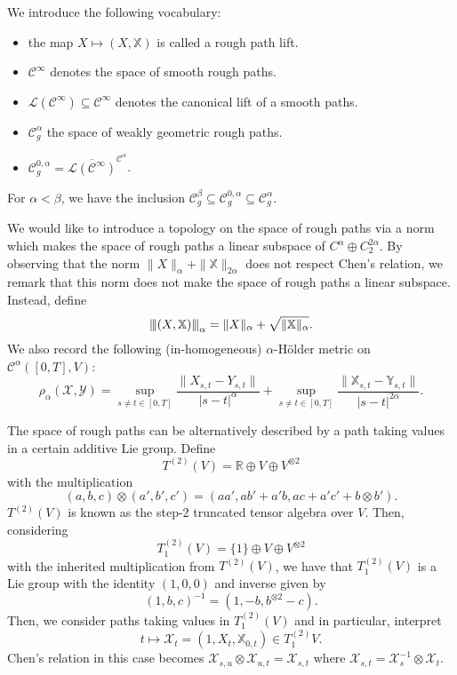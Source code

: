 \documentclass[]{article}
\theoremstyle{definition}
\theoremstyle{definition}
\newcommand{\vertiii}[1]{{\left\vert\kern-0.25ex\left\vert\kern-0.25ex\left\vert #1 
    \right\vert\kern-0.25ex\right\vert\kern-0.25ex\right\vert}}
\begin{document}
We introduce the following vocabulary:
\begin{itemize}
  \item the map \(X \mapsto (X, \mathbb{X})\) is called a rough path lift.
  \item \(\mathcal{C}^\infty\) denotes the space of smooth rough paths.
  \item \(\mathcal{L}(\mathcal{C}^\infty) \subseteq \mathcal{C}^\infty\) denotes the canonical lift of a smooth paths.
  \item \(\mathcal{C}^\alpha_g\) the space of weakly geometric rough paths.
  \item \(\mathcal{C}^{0, \alpha}_g = \overline{\mathcal{L}(\mathcal{C}^\infty)}^{\mathcal{C}^\alpha}\).
\end{itemize}

For \(\alpha < \beta\), we have the inclusion \(\mathcal{C}^\beta_g \subseteq \mathcal{C}^{0, \alpha}_g \subseteq \mathcal{C}^\alpha_g\).

We would like to introduce a topology on the space of rough paths via a norm which makes the space of rough paths 
a linear subspace of \(C^\alpha \oplus C_2^{2\alpha}\). By observing that the norm \(\|X\|_{\alpha} + \|\mathbb{X}\|_{2\alpha}\)
does not respect Chen's relation, we remark that this norm does not make the space of rough paths a linear subspace. 
Instead, define 
\[\vertiii{(X, \mathbb{X})}_\alpha = \|X\|_\alpha + \sqrt{\|\mathbb{X}\|_{\alpha}}.\]
We also record the following (in-homogeneous) \(\alpha\)-H\"older metric on \(\mathcal{C}^\alpha([0, T], V)\):
\[\rho_\alpha(\mathcal{X}, \mathcal{Y}) = \sup_{s \neq t \in [0, T]}\frac{\|X_{s, t} - Y_{s, t}\|}{|s - t|^\alpha} + 
  \sup_{s \neq t \in [0, T]}\frac{\|\mathbb{X}_{s, t} - \mathbb{Y}_{s, t}\|}{|s - t|^{2\alpha}}.\]


The space of rough paths can be alternatively described by a path taking values in a certain additive Lie group. 
Define 
\[T^{(2)}(V) = \mathbb{R} \oplus V \oplus V^{\otimes 2}\]
with the multiplication 
\[(a, b, c) \otimes (a', b', c') = (aa', ab' + a'b, ac + a'c' + b \otimes b').\]
\(T^{(2)}(V)\) is known as the step-2 truncated tensor algebra over \(V\). Then, considering 
\[T^{(2)}_1(V) = \{1\} \oplus V \oplus V^{\otimes 2}\]
with the inherited multiplication from \(T^{(2)}(V)\), we have that \(T^{(2)}_1(V)\) is a Lie group 
with the identity \((1, 0, 0)\) and inverse given by 
\[(1, b, c)^{-1} = (1, -b, b^{\otimes 2} - c).\]
Then, we consider paths taking values in \(T^{(2)}_1(V)\) and in particular, interpret 
\[t \mapsto \mathcal{X}_t = (1, X_t, \mathbb{X}_{0, t}) \in T^{(2)}_1{V}.\]
Chen's relation in this case becomes \(\mathcal{X}_{s, u} \otimes \mathcal{X}_{u, t} = \mathcal{X}_{s, t}\) 
where \(\mathcal{X}_{s, t} = \mathcal{X}_{s}^{-1} \otimes \mathcal{X}_t\).
\end{document}
